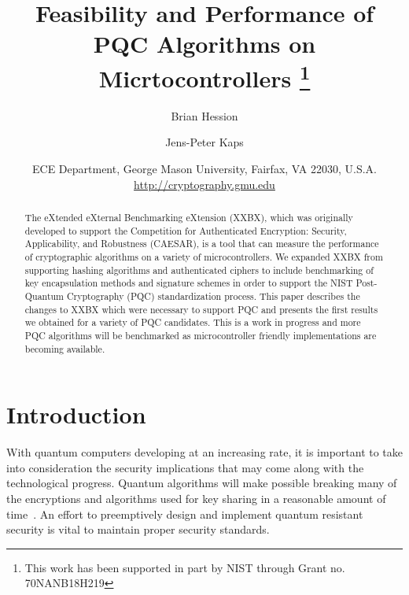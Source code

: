 \documentclass[10pt]{article}
\begin{document}
\title{Feasibility and Performance of PQC Algorithms on Micrtocontrollers %
\thanks{This work has been supported in part by NIST through
Grant no. 70NANB18H219}%
} 

\author{Brian Hession \and Jens-Peter Kaps}

\date{ECE Department, George Mason University, Fairfax, VA 22030, U.S.A.\\
\url{http://cryptography.gmu.edu}}%

\maketitle

\begin{abstract}
The eXtended eXternal Benchmarking eXtension (XXBX), which was originally developed
to support the Competition for Authenticated Encryption: Security, Applicability, 
and Robustness (CAESAR), is a tool that can measure the performance of cryptographic 
algorithms on a variety of microcontrollers. We expanded XXBX from supporting 
hashing algorithms and authenticated ciphers to include benchmarking of key encapsulation 
methods and signature schemes in order to support the NIST Post-Quantum
Cryptography (PQC) standardization process. 
This paper describes the changes to XXBX which were necessary to support PQC and 
presents the first results we obtained for a variety of PQC candidates.
This is a work in progress and more PQC algorithms will be benchmarked as 
microcontroller friendly implementations are becoming available.
\end{abstract}


\section{Introduction}

With quantum computers developing at an increasing rate, it is important to take into 
consideration the security implications that may come along with the technological progress. 
Quantum algorithms will make possible breaking many of the encryptions and algorithms used for 
key sharing in a reasonable amount of time~\cite{tobefound}.
An effort to preemptively design and implement 
quantum resistant security is vital to maintain proper security standards.
\end{document}
